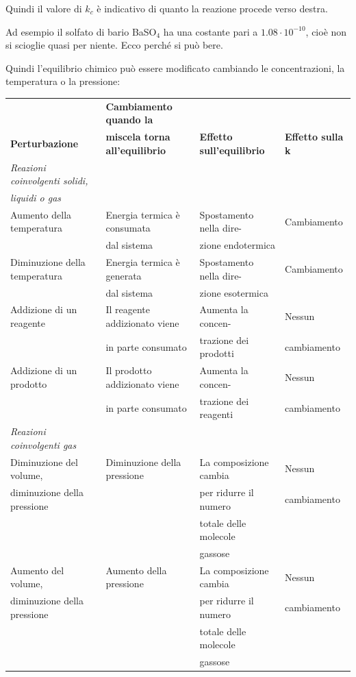 \vspace{0.2cm}Quindi il valore di $k_c$ è indicativo di quanto la reazione procede verso destra.

Ad esempio il solfato di bario BaSO$_4$ ha una costante pari a $1.08 \cdot 10^{-10}$, cioè non si scioglie quasi per niente. Ecco perché si può bere.

Quindi l'equilibrio chimico può essere modificato cambiando le concentrazioni, la temperatura o la pressione:

\vspace{0.2cm}\hspace{-0.8cm}\footnotesize\begin{tabular}{|l|l|l|l|}
    \hline
    & \textbf{Cambiamento quando la} &  &\\
    \textbf{Perturbazione} & \textbf{miscela torna all'equilibrio} & \textbf{Effetto sull'equilibrio} & \textbf{Effetto sulla k}\\
    \hline
    \textit{Reazioni coinvolgenti solidi,}&&&\\
    \textit{liquidi o gas} &&&\\[0.5ex]
    \hline
    Aumento della temperatura & Energia termica è consumata & Spostamento nella dire- & Cambiamento\\
    & dal sistema & zione endotermica &\\[0.5ex]
    \hline
    Diminuzione della temperatura & Energia termica è generata & Spostamento nella dire- & Cambiamento\\
    & dal sistema & zione esotermica &\\
    \hline
    Addizione di un reagente & Il reagente addizionato viene & Aumenta la concen- & Nessun\\
    & in parte consumato & trazione dei prodotti & cambiamento\\[0.5ex]
    \hline
    Addizione di un prodotto & Il prodotto addizionato viene & Aumenta la concen- & Nessun\\
    & in parte consumato & trazione dei reagenti & cambiamento\\[0.5ex]
    \hline
    \textit{Reazioni coinvolgenti gas} &&&\\[0.5ex]
    \hline
    Diminuzione del volume, & Diminuzione della pressione & La composizione cambia & Nessun\\
    diminuzione della pressione & & per ridurre il numero &cambiamento\\
    &&totale delle molecole&\\
    &&gassose&\\[0.5ex]
    \hline
    Aumento del volume, & Aumento della pressione & La composizione cambia & Nessun\\
    diminuzione della pressione & & per ridurre il numero &cambiamento\\
    &&totale delle molecole&\\
    &&gassose&\\
    \hline
\end{tabular}

